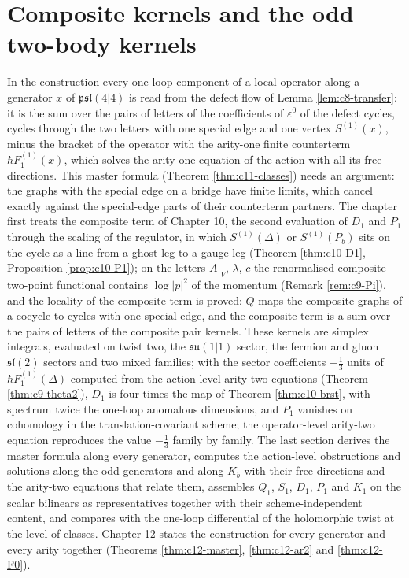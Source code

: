 \chapter{Composite kernels and the odd two-body kernels}

In the construction every one-loop component of a local operator along a generator $x$ of $\mathfrak{psl}(4|4)$ is read from the defect flow of Lemma \ref{lem:c8-transfer}: it is the sum over the pairs of letters of the coefficients of $\varepsilon^0$ of the defect cycles, cycles through the two letters with one special edge and one vertex $S^{(1)}(x)$, minus the bracket of the operator with the arity-one finite counterterm $\hbar F_1^{(1)}(x)$, which solves the arity-one equation of the action with all its free directions. This master formula (Theorem \ref{thm:c11-classes}) needs an argument: the graphs with the special edge on a bridge have finite limits, which cancel exactly against the special-edge parts of their counterterm partners. The chapter first treats the composite term of Chapter 10, the second evaluation of $D_1$ and $P_1$ through the scaling of the regulator, in which $S^{(1)}(\Delta)$ or $S^{(1)}(P_b)$ sits on the cycle as a line from a ghost leg to a gauge leg (Theorem \ref{thm:c10-D1}, Proposition \ref{prop:c10-P1}); on the letters $A|_V$, $\lambda$, $c$ the renormalised composite two-point functional contains $\log|p|^2$ of the momentum (Remark \ref{rem:c9-Pi}), and the locality of the composite term is proved: $Q$ maps the composite graphs of a cocycle to cycles with one special edge, and the composite term is a sum over the pairs of letters of the composite pair kernels. These kernels are simplex integrals, evaluated on twist two, the $\mathfrak{su}(1|1)$ sector, the fermion and gluon $\mathfrak{sl}(2)$ sectors and two mixed families; with the sector coefficients $-\tfrac13$ units of $\hbar F_1^{(1)}(\Delta)$ computed from the action-level arity-two equations (Theorem \ref{thm:c9-theta2}), $D_1$ is four times the map of Theorem \ref{thm:c10-brst}, with spectrum twice the one-loop anomalous dimensions, and $P_1$ vanishes on cohomology in the translation-covariant scheme; the operator-level arity-two equation reproduces the value $-\tfrac13$ family by family. The last section derives the master formula along every generator, computes the action-level obstructions and solutions along the odd generators and along $K_b$ with their free directions and the arity-two equations that relate them, assembles $Q_1$, $S_1$, $D_1$, $P_1$ and $K_1$ on the scalar bilinears as representatives together with their scheme-independent content, and compares with the one-loop differential of the holomorphic twist at the level of classes. Chapter 12 states the construction for every generator and every arity together (Theorems \ref{thm:c12-master}, \ref{thm:c12-ar2} and \ref{thm:c12-F0}).

